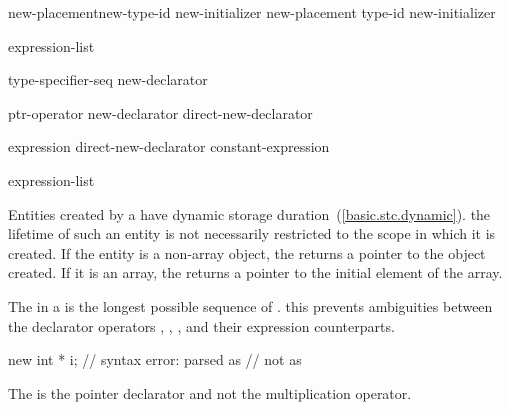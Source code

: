 \begin{bnf}
\br
    \terminal{::}\opt {} new-placement\opt new-type-id new-initializer\opt \br
    \terminal{::}\opt {} new-placement\opt \terminal{(} type-id \terminal{)} new-initializer\opt
\end{bnf}

%
%
\begin{bnf}
\br
    \terminal{(} expression-list \terminal{)}
\end{bnf}

\begin{bnf}
\br
    type-specifier-seq new-declarator\opt
\end{bnf}

\begin{bnf}
\br
    ptr-operator new-declarator\opt \br
    direct-new-declarator
\end{bnf}

\begin{bnf}
\br
    \terminal{[} expression \terminal{]}\br
    direct-new-declarator \terminal{[} constant-expression \terminal{]}
\end{bnf}

\begin{bnf}
\br
    \terminal{(} expression-list\opt \terminal{)}
\end{bnf}

%
Entities created by a  have dynamic storage
duration~(\ref{basic.stc.dynamic}).
\enternote 
{}%
the lifetime of such an entity is not necessarily restricted to the
scope in which it is created.
\exitnote 
If the entity is a non-array object, the 
returns a pointer to the object created. If it is an array, the
 returns a pointer to the initial element of
the array.

\pnum
The  in a  is the longest
possible sequence of .
\enternote 
this prevents ambiguities between the declarator operators \tcode{\&},
\tcode{*}, \tcode{[]}, and their expression counterparts.
\exitnote 
\enterexample 

\begin{codeblock}
new int * i;                    // syntax error: parsed as 
				//	not as 
\end{codeblock}
The \tcode{*} is the pointer declarator and not the multiplication
operator.
\exitexample 

